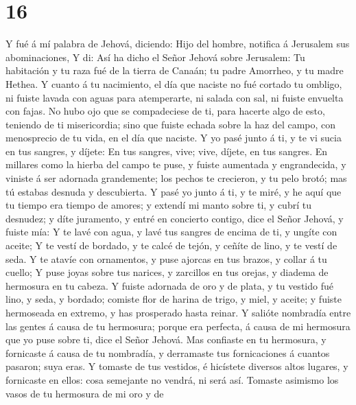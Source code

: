 \hypertarget{section-15}{%
\section{16}\label{section-15}}

 Y fué á mí palabra de Jehová, diciendo:  Hijo
del hombre, notifica á Jerusalem sus abominaciones,  Y di:
Así ha dicho el Señor Jehová sobre Jerusalem: Tu habitación y tu raza
fué de la tierra de Canaán; tu padre Amorrheo, y tu madre Hethea.
 Y cuanto á tu nacimiento, el día que naciste no fué cortado
tu ombligo, ni fuiste lavada con aguas para atemperarte, ni salada con
sal, ni fuiste envuelta con fajas.  No hubo ojo que se
compadeciese de ti, para hacerte algo de esto, teniendo de ti
misericordia; sino que fuiste echada sobre la haz del campo, con
menosprecio de tu vida, en el día que naciste.  Y yo pasé
junto á ti, y te vi sucia en tus sangres, y díjete: En tus sangres,
vive; vive, díjete, en tus sangres.  En millares como la
hierba del campo te puse, y fuiste aumentada y engrandecida, y viniste á
ser adornada grandemente; los pechos te crecieron, y tu pelo brotó; mas
tú estabas desnuda y descubierta.  Y pasé yo junto á ti, y
te miré, y he aquí que tu tiempo era tiempo de amores; y extendí mi
manto sobre ti, y cubrí tu desnudez; y díte juramento, y entré en
concierto contigo, dice el Señor Jehová, y fuiste mía:  Y te
lavé con agua, y lavé tus sangres de encima de ti, y ungíte con aceite;
 Y te vestí de bordado, y te calcé de tejón, y ceñíte de
lino, y te vestí de seda.  Y te atavíe con ornamentos, y
puse ajorcas en tus brazos, y collar á tu cuello;  Y puse
joyas sobre tus narices, y zarcillos en tus orejas, y diadema de
hermosura en tu cabeza.  Y fuiste adornada de oro y de
plata, y tu vestido fué lino, y seda, y bordado; comiste flor de harina
de trigo, y miel, y aceite; y fuiste hermoseada en extremo, y has
prosperado hasta reinar.  Y salióte nombradía entre las
gentes á causa de tu hermosura; porque era perfecta, á causa de mi
hermosura que yo puse sobre ti, dice el Señor Jehová.  Mas
confiaste en tu hermosura, y fornicaste á causa de tu nombradía, y
derramaste tus fornicaciones á cuantos pasaron; suya eras. 
Y tomaste de tus vestidos, é hicístete diversos altos lugares, y
fornicaste en ellos: cosa semejante no vendrá, ni será así.
 Tomaste asimismo los vasos de tu hermosura de mi oro y de
